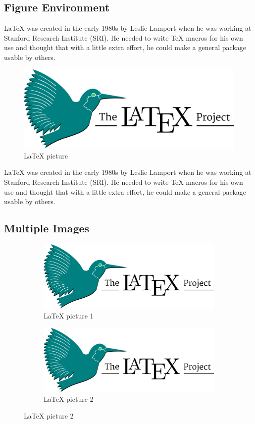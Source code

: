 \documentclass[12pt]{article}
\begin{document}
	\subsection{Figure Environment}
	LaTeX was created in the early 1980s by Leslie Lamport when he was working at Stanford Research Institute (SRI). He needed to write TeX macros for his own use and thought that with a little extra effort, he could make a general package usable by others.
	\begin{figure}[H]
		\centering
		\includegraphics[width=0.5\linewidth]{pic1.png}
		\caption{LaTeX picture}
		\label{fig1}
	\end{figure}
	LaTeX was created in the early 1980s by Leslie Lamport when he was working at Stanford Research Institute (SRI). He needed to write TeX macros for his own use and thought that with a little extra effort, he could make a general package usable by others.
	\subsection{Multiple Images}
	\begin{figure}[H]
		\centering
		\begin{subfigure}{0.4\linewidth}
			\includegraphics[width=\linewidth]{pic1.png}
			\caption{LaTeX picture 1}
		\end{subfigure}
		\hfill
		\begin{subfigure}{0.4\linewidth}
			\includegraphics[width=0.8\linewidth]{pic1.png}
			\caption{LaTeX picture 2}
		\end{subfigure}
	\end{figure}
\end{document}
